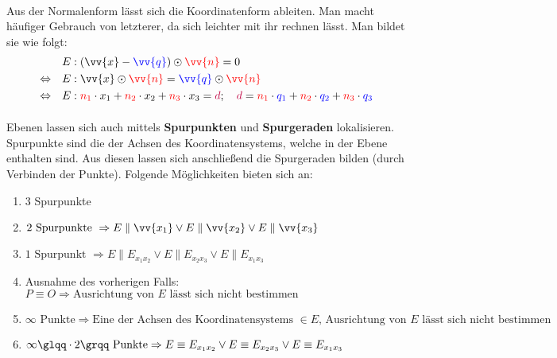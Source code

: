 \documentclass[main.tex]{subfiles}
\begin{document}
        \paragraph{} Aus der Normalenform lässt sich die Koordinatenform ableiten. Man macht häufiger Gebrauch von letzterer, da sich leichter
        mit ihr rechnen lässt. Man bildet sie wie folgt:
        \begin{align*}
                                  &E:(\vv{x} - \textcolor{blue}{\vv{q}}) \odot \textcolor{red}{\vv{n}} = 0 \\
            \Leftrightarrow \quad &E:\vv{x} \odot \textcolor{red}{\vv{n}} = \textcolor{blue}{\vv{q}} \odot \textcolor{red}{\vv{n}} \\
            \Leftrightarrow \quad &E:\textcolor{red}{n_1} \cdot x_1 + \textcolor{red}{n_2} \cdot x_2 + \textcolor{red}{n_3} \cdot x_3 = \textcolor{purple}{d} ; \quad \textcolor{purple}{d} = \textcolor{red}{n_1} \cdot \textcolor{blue}{q_1} + \textcolor{red}{n_2} \cdot \textcolor{blue}{q_2} + \textcolor{red}{n_3} \cdot \textcolor{blue}{q_3}
        \end{align*}

        \begin{Bemerkung}
            \paragraph{} Ebenen lassen sich auch mittels \textbf{Spurpunkten} und \textbf{Spurgeraden} lokalisieren. Spurpunkte sind die
            der Achsen des Koordinatensystems, welche in der Ebene enthalten sind. Aus diesen lassen sich anschließend die Spurgeraden bilden
            (durch Verbinden der Punkte). Folgende Möglichkeiten bieten sich an:
            \begin{enumerate}[1)]
                \item 3 Spurpunkte
                \item $\text{2 Spurpunkte } \Rightarrow E \parallel \vv{x_1} \lor E \parallel \vv{x_2} \lor E \parallel \vv{x_3}$
                \item $\text{1 Spurpunkt } \Rightarrow E \parallel E_{x_{1}x_2} \lor E \parallel E_{x_{2}x_3} \lor E \parallel E_{x_{1}x_3}$
                \item Ausnahme des vorherigen Falls: $P \equiv O \Rightarrow \text{Ausrichtung von $E$ lässt sich nicht bestimmen}$
                \item $\infty \text{ Punkte} \Rightarrow \text{Eine der Achsen des Koordinatensystems $\in E$, Ausrichtung von $E$ lässt sich nicht bestimmen}$
                \item $\infty \glqq \cdot 2 \grqq \text{ Punkte} \Rightarrow E \equiv E_{x_{1}x_2} \lor E \equiv E_{x_{2}x_3} \lor E \equiv E_{x_{1}x_3}$
            \end{enumerate}
        \end{Bemerkung}
\end{document}
